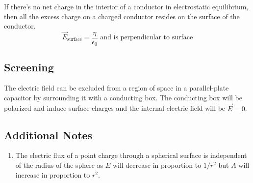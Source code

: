 \documentclass{article}
\begin{document}
If there's no net charge in the interior of a conductor in electrostatic equilibrium, then all the excess charge on a charged conductor resides on the surface of the conductor.
\[\vec{E}_{\text{surface}}=\frac{\eta}{\epsilon_0}\text{ and is perpendicular to surface}\]

\subsection*{Screening}
The electric field can be excluded from a region of space in a parallel-plate capacitor by surrounding it with a conducting box. The conducting box will be polarized and induce surface charges and the internal electric field will be $\vec{E}=0$.

\subsection*{Additional Notes}
\begin{enumerate}
    \item The electric flux of a point charge through a spherical surface is independent of the radius of the sphere as $E$ will decrease in proportion to $1/r^2$ but $A$ will increase in proportion to $r^2$.
\end{enumerate}
\end{document}
